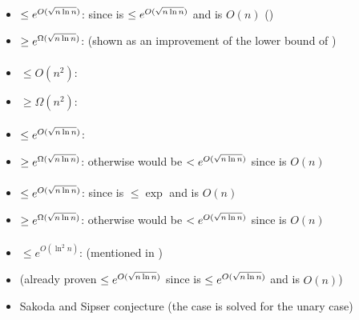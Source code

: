 \paragraph{\TDFA{}\tto\ONFA}\label{cost:2DFAto1NFAu}
\begin{itemize}
	\item $\le e^{O(\sqrt{n\ln n})}$: since \hyperref[cost:2DFAto1DFAu]{\TDFA{}\tto\ODFA} is $\le e^{O(\sqrt{n\ln n})}$ and \ODFA{}\tto\ONFA is $O(n)$ (\cite{Chr86})
	\item $\ge e^{\Omega(\sqrt{n\ln n})}$: \cite{Chr86} (shown as an improvement of the lower bound of \hyperref[cost:2DFAto1DFAu]{\TDFA{}\tto\ODFA})
\end{itemize}
\paragraph{\ONFA{}\tto\TDFA}\label{cost:1NFAto2DFAu}
\begin{itemize}
	\item $\le O(n^2)$: \cite{Chr86}
	\item $\ge \Omega(n^2)$: \cite{Chr86}
\end{itemize}
\paragraph{\TNFA{}\tto\ODFA}\label{cost:2NFAto1DFAu}
\begin{itemize}
	\item $\le e^{O(\sqrt{n\ln n})}$: \cite{MerPig01}
	\item $\ge e^{\Omega(\sqrt{n\ln n})}$: otherwise \hyperref[cost:2DFAto1DFAu]{\TDFA{}\tto\ODFA} would be $<e^{O(\sqrt{n\ln n})}$ since \TDFA{}\tto\TNFA is $O(n)$
\end{itemize}
\paragraph{\TNFA{}\tto\ONFA}
\begin{itemize}
	\item $\le e^{O(\sqrt{n\ln n})}$: since \hyperref[cost:2NFAto1DFAu]{\TNFA{}\tto\ODFA} is $\le\exp$ and \ODFA{}\tto\ONFA is $O(n)$
	\item $\ge e^{\Omega(\sqrt{n\ln n})}$: otherwise \hyperref[cost:2DFAto1NFAu]{\TDFA{}\tto\ONFA} would be $<e^{O(\sqrt{n\ln n})}$ since \TDFA{}\tto\TNFA is $O(n)$
\end{itemize}
\paragraph{\TNFA{}\tto\TDFA}\label{cost:2NFAto2DFAu}
\begin{itemize}
	\item $\le e^{O(\ln^2n)}$: \cite{GefMer+03} (mentioned in \cite{Pig15})
	\item (already proven $\le e^{O(\sqrt{n\ln n})}$ since \hyperref[cost:2NFAto1DFAu]{\TNFA{}\tto\ODFA} is $\le e^{O(\sqrt{n\ln n})}$ and \ODFA{}\tto\TDFA is $O(n)$)
	\item Sakoda and Sipser conjecture (the case \hyperref[cost:1NFAto2DFAu]{\ONFA{}\tto\TDFA} is solved for the unary case)
\end{itemize}


